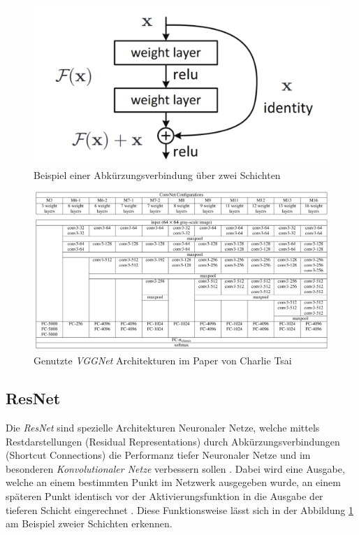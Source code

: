 \documentclass[twoside,a4paper]{IEEEtran}
\begin{document}
\begin{figure}[!htb]
	\includegraphics[width=\columnwidth]{residual}
	\caption{Beispiel einer Abkürzungsverbindung über zwei Schichten \cite[S.2]{resnet}}
	\label{res}
\end{figure}

\begin{figure}[!htb]
	\centering
	\includegraphics[width=2.1\columnwidth]{conv_net_architectures}
	\caption{Genutzte \emph{VGGNet} Architekturen im Paper von Charlie Tsai \cite[S.3]{RHC}}
	\label{vggnet}
\end{figure}

\subsection{ResNet} %
Die \emph{ResNet} sind spezielle Architekturen Neuronaler Netze, welche mittels Restdarstellungen (Residual Representations) durch Abkürzungsverbindungen (Shortcut Connections) die Performanz tiefer Neuronaler Netze und im besonderen \emph{Konvolutionaler Netze} verbessern sollen \cite[S.1-2]{resnet}. Dabei wird eine Ausgabe, welche an einem bestimmten Punkt im Netzwerk ausgegeben wurde, an einem späteren Punkt identisch vor der Aktivierungsfunktion in die Ausgabe der tieferen Schicht eingerechnet \cite[S.4]{resnet}. Diese Funktionsweise lässt sich in der Abbildung \ref{res} am Beispiel zweier Schichten erkennen.
\end{document}
